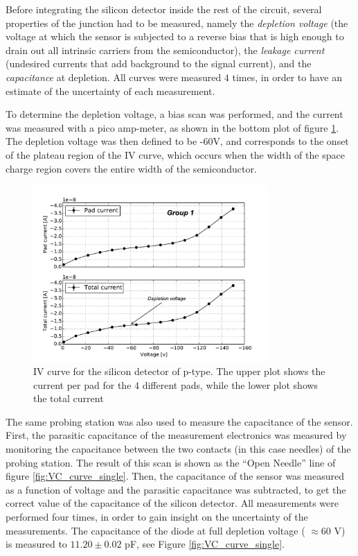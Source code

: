 \documentclass[12pt]{article}
\begin{document}
Before integrating the silicon detector inside the rest of the circuit, several properties of the junction had to be measured, namely the \textit{depletion voltage} (the voltage at which the sensor is subjected to a reverse bias that is high enough to drain out all intrinsic carriers from the semiconductor), the \textit{leakage current} (undesired currents that add background to the signal current), and the \textit{capacitance} at depletion. All curves were measured $4$ times, in order to have an estimate of the uncertainty of each measurement.

To determine the depletion voltage, a bias scan was performed, and the current was measured with a pico amp-meter, as shown in the bottom plot of figure \ref{fig:IVcurve}. The depletion voltage was then defined to be -60V, and corresponds to the onset of the plateau region of the IV curve, which occurs when the width of the space charge region covers the entire width of the semiconductor.

\begin{figure}[htb]
  \centering
  \includegraphics[width=0.8\textwidth]{./graphics/IV_V_vs_A.pdf}
  \caption{IV curve for the silicon detector of p-type. The upper plot shows the current per pad for the $4$ different pads, while the lower plot shows the total current }
  \label{fig:IVcurve}
\end{figure}

The same probing station was also used to measure the capacitance of the sensor. First, the parasitic capacitance of the measurement electronics was measured by monitoring the capacitance between the two contacts (in this case needles) of the probing station. The result of this scan is shown as the ``Open Needle'' line of figure \ref{fig:VC_curve_single}. Then, the capacitance of the sensor was measured as a function of voltage and the parasitic capacitance was subtracted, to get the correct value of the capacitance of the silicon detector. All measurements were performed four times, in order to gain insight on the uncertainty of the measurements. The capacitance of the diode at full depletion voltage ( $\approx 60$ V) is measured to $11.20 \pm 0.02$ pF, see Figure \ref{fig:VC_curve_single}.
\end{document}

